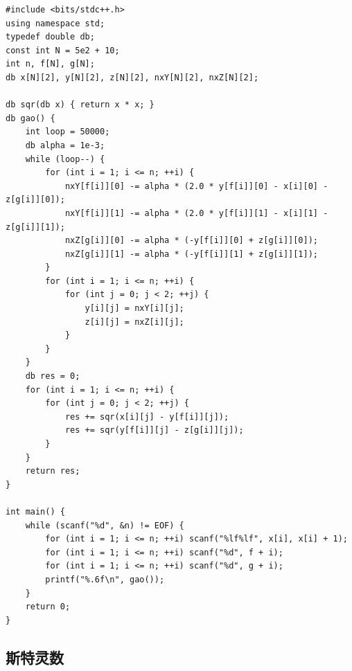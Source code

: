 \begin{lstlisting}
#include <bits/stdc++.h>
using namespace std;
typedef double db;
const int N = 5e2 + 10;
int n, f[N], g[N]; 
db x[N][2], y[N][2], z[N][2], nxY[N][2], nxZ[N][2]; 

db sqr(db x) { return x * x; }
db gao() {
	int loop = 50000;
	db alpha = 1e-3;
	while (loop--) {
		for (int i = 1; i <= n; ++i) {
			nxY[f[i]][0] -= alpha * (2.0 * y[f[i]][0] - x[i][0] - z[g[i]][0]);
			nxY[f[i]][1] -= alpha * (2.0 * y[f[i]][1] - x[i][1] - z[g[i]][1]);
			nxZ[g[i]][0] -= alpha * (-y[f[i]][0] + z[g[i]][0]);
			nxZ[g[i]][1] -= alpha * (-y[f[i]][1] + z[g[i]][1]);
		}
		for (int i = 1; i <= n; ++i) {
			for (int j = 0; j < 2; ++j) {
				y[i][j] = nxY[i][j];
				z[i][j] = nxZ[i][j];
			}
		}
	}
	db res = 0;
	for (int i = 1; i <= n; ++i) {
		for (int j = 0; j < 2; ++j) {
			res += sqr(x[i][j] - y[f[i]][j]);
			res += sqr(y[f[i]][j] - z[g[i]][j]);
		}
	}
	return res;
}

int main() {
	while (scanf("%d", &n) != EOF) {
		for (int i = 1; i <= n; ++i) scanf("%lf%lf", x[i], x[i] + 1);
		for (int i = 1; i <= n; ++i) scanf("%d", f + i);
		for (int i = 1; i <= n; ++i) scanf("%d", g + i);
		printf("%.6f\n", gao());
	}
	return 0;
}
\end{lstlisting}

\subsection{斯特灵数}

